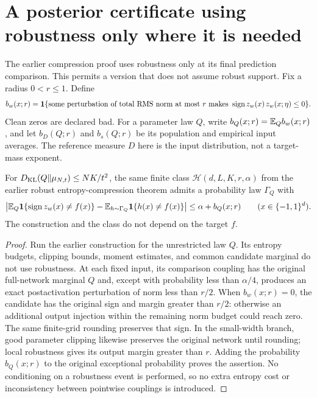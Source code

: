 \section{A posterior certificate using robustness only where it is needed}
\label{sec:pointwise}

The earlier compression proof uses robustness only at its final prediction
comparison. This permits a version that does not assume robust support.
Fix a radius $0<r\le1$. Define
\[
 b_w(x;r)=\mathbf1\{\text{some perturbation of total RMS norm at most }r
 \text{ makes }\operatorname{sign} z_w(x)\,z_w(x;\eta)\le0\}.
\]
Clean zeros are declared bad. For a parameter law $Q$, write
$b_Q(x;r)=\mathbb E_Q b_w(x;r)$, and let $b_D(Q;r)$ and $b_s(Q;r)$ be its
population and empirical input averages. The reference measure $D$ here is
the input distribution, not a target-mass exponent.

\begin{proposition}
For $D_{\rm KL}(Q\Vert\mu_{N,t})\le NK/t^2$, the same finite class
$\mathcal H(d,L,K,r,\alpha)$ from the earlier robust entropy-compression
theorem admits a probability law $\Gamma_Q$ with
\[
 \left|\mathbb E_Q\mathbf1\{\operatorname{sign} z_w(x)\ne f(x)\}
       -\mathbb E_{h\sim\Gamma_Q}\mathbf1\{h(x)\ne f(x)\}\right|
 \le\alpha+b_Q(x;r)\qquad(x\in\{-1,1\}^d).
\]
The construction and the class do not depend on the target $f$.
\end{proposition}
\begin{proof}
Run the earlier construction for the unrestricted law $Q$. Its entropy
budgets, clipping bounds, moment estimates, and common candidate marginal
do not use robustness. At each fixed input, its comparison coupling has
the original full-network marginal $Q$ and, except with probability less
than $\alpha/4$, produces an exact postactivation perturbation of norm
less than $r/2$. When $b_w(x;r)=0$, the candidate has the original sign
and margin greater than $r/2$: otherwise an additional output injection
within the remaining norm budget could reach zero. The same finite-grid
rounding preserves that sign. In the small-width branch, good parameter
clipping likewise preserves the original network until rounding; local
robustness gives its output margin greater than $r$. Adding the probability
$b_Q(x;r)$ to the original exceptional probability proves the assertion.
No conditioning on a robustness event is performed, so no extra entropy
cost or inconsistency between pointwise couplings is introduced.
\end{proof}

